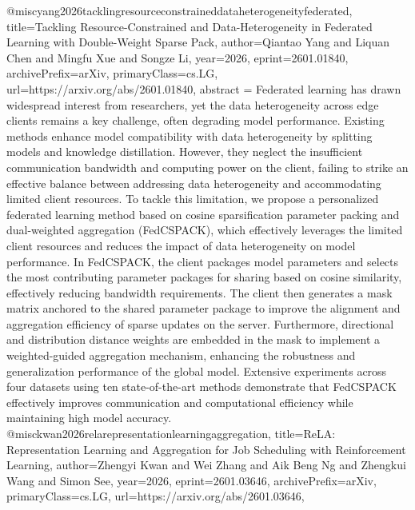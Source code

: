 {}@misc{yang2026tacklingresourceconstraineddataheterogeneityfederated,
      title={Tackling Resource-Constrained and Data-Heterogeneity in Federated Learning with Double-Weight Sparse Pack}, 
      author={Qiantao Yang and Liquan Chen and Mingfu Xue and Songze Li},
      year={2026},
      eprint={2601.01840},
      archivePrefix={arXiv},
      primaryClass={cs.LG},
      url={https://arxiv.org/abs/2601.01840},
      abstract = {Federated learning has drawn widespread interest from researchers, yet the data heterogeneity across edge clients remains a key challenge, often degrading model performance. Existing methods enhance model compatibility with data heterogeneity by splitting models and knowledge distillation. However, they neglect the insufficient communication bandwidth and computing power on the client, failing to strike an effective balance between addressing data heterogeneity and accommodating limited client resources. To tackle this limitation, we propose a personalized federated learning method based on cosine sparsification parameter packing and dual-weighted aggregation (FedCSPACK), which effectively leverages the limited client resources and reduces the impact of data heterogeneity on model performance. In FedCSPACK, the client packages model parameters and selects the most contributing parameter packages for sharing based on cosine similarity, effectively reducing bandwidth requirements. The client then generates a mask matrix anchored to the shared parameter package to improve the alignment and aggregation efficiency of sparse updates on the server. Furthermore, directional and distribution distance weights are embedded in the mask to implement a weighted-guided aggregation mechanism, enhancing the robustness and generalization performance of the global model. Extensive experiments across four datasets using ten state-of-the-art methods demonstrate that FedCSPACK effectively improves communication and computational efficiency while maintaining high model accuracy.}
}@misc{kwan2026relarepresentationlearningaggregation,
      title={ReLA: Representation Learning and Aggregation for Job Scheduling with Reinforcement Learning}, 
      author={Zhengyi Kwan and Wei Zhang and Aik Beng Ng and Zhengkui Wang and Simon See},
      year={2026},
      eprint={2601.03646},
      archivePrefix={arXiv},
      primaryClass={cs.LG},
      url={https://arxiv.org/abs/2601.03646},
}

